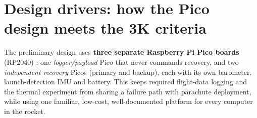 \section{Design drivers: how the Pico design meets the 3K criteria}
The preliminary design uses \textbf{three separate Raspberry Pi Pico boards} (RP2040) \cite{picods,rp2040ds}: one \emph{logger/payload} Pico that never commands recovery, and two \emph{independent recovery} Picos (primary and backup), each with its own barometer, launch-detection IMU and battery. This keeps required flight-data logging and the thermal experiment from sharing a failure path with parachute deployment, while using one familiar, low-cost, well-documented platform for every computer in the rocket.

